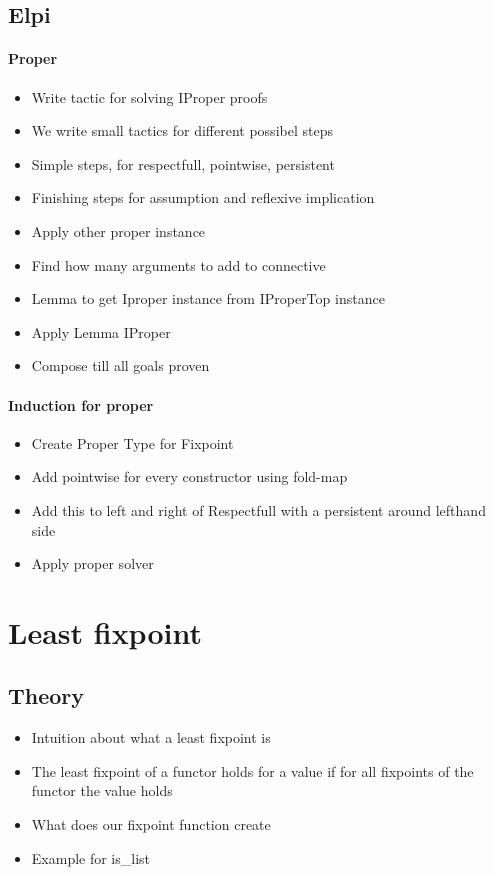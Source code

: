 \documentclass[thesis.tex]{subfiles}
\begin{document}
\subsection{Elpi}
\paragraph{Proper}
\begin{itemize}
  \item Write tactic for solving IProper proofs
  \item We write small tactics for different possibel steps
  \item Simple steps, for respectfull, pointwise, persistent
  \item Finishing steps for assumption and reflexive implication
  \item Apply other proper instance
  \item Find how many arguments to add to connective
  \item Lemma to get Iproper instance from IProperTop instance
  \item Apply Lemma IProper
  \item Compose till all goals proven
\end{itemize}

\paragraph{Induction for proper}
\begin{itemize}
  \item Create Proper Type for Fixpoint
  \item Add pointwise for every constructor using fold-map
  \item Add this to left and right of Respectfull with a persistent around lefthand side
  \item Apply proper solver
\end{itemize}

\section{Least fixpoint}
\subsection{Theory}
\begin{itemize}
  \item Intuition about what a least fixpoint is
  \item The least fixpoint of a functor holds for a value if for all fixpoints of the functor the value holds
  \item What does our fixpoint function create
  \item Example for is_list
\end{itemize}
\end{document}
